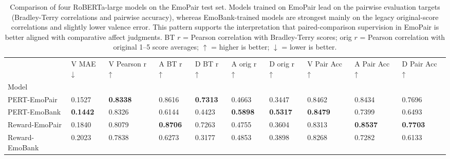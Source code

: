 \begin{table}
\caption{Comparison of four RoBERTa-large models on the EmoPair test set. Models trained on EmoPair lead on the pairwise evaluation targets (Bradley-Terry correlations and pairwise accuracy), whereas EmoBank-trained models are strongest mainly on the legacy original-score correlations and slightly lower valence error. This pattern supports the interpretation that paired-comparison supervision in EmoPair is better aligned with comparative affect judgments. BT $r$ = Pearson correlation with Bradley-Terry scores; orig $r$ = Pearson correlation with original 1--5 score averages; $\uparrow$ = higher is better; $\downarrow$ = lower is better.}
\label{tab:model_comparison}
\begin{tabular}{llllllllll}
\toprule
 & V MAE ↓ & V Pearson r ↑ & A BT r ↑ & D BT r ↑ & A orig r ↑ & D orig r ↑ & V Pair Acc ↑ & A Pair Acc ↑ & D Pair Acc ↑ \\
Model &  &  &  &  &  &  &  &  &  \\
\midrule
PERT-EmoPair & 0.1527 & \textbf{0.8338} & 0.8616 & \textbf{0.7313} & 0.4663 & 0.3447 & 0.8462 & 0.8434 & 0.7696 \\
PERT-EmoBank & \textbf{0.1442} & 0.8326 & 0.6144 & 0.4423 & \textbf{0.5898} & \textbf{0.5317} & \textbf{0.8479} & 0.7399 & 0.6493 \\
Reward-EmoPair & 0.1840 & 0.8079 & \textbf{0.8706} & 0.7263 & 0.4755 & 0.3604 & 0.8313 & \textbf{0.8537} & \textbf{0.7703} \\
Reward-EmoBank & 0.2023 & 0.7838 & 0.6273 & 0.3177 & 0.4853 & 0.3898 & 0.8268 & 0.7282 & 0.6133 \\
\bottomrule
\end{tabular}
\end{table}
